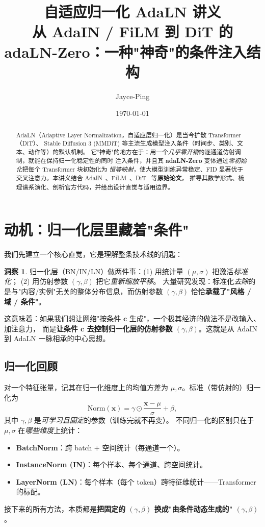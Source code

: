 \documentclass[11pt]{ctexart}
\title{\bfseries 自适应归一化 AdaLN 讲义\\[2mm]
\large 从 AdaIN / FiLM 到 DiT 的 adaLN-Zero：一种"神奇"的条件注入结构}
\author{Jayce-Ping}
\date{\today}
\newcommand{\cc}{\mathbf{c}}
\newcommand{\xx}{\mathbf{x}}
\theoremstyle{definition}
\newtheorem{insight}{洞察}[section]
\begin{document}
\maketitle

\begin{abstract}
AdaLN（Adaptive Layer Normalization，自适应层归一化）是当今扩散 Transformer（DiT）、
Stable Diffusion 3 (MMDiT) 等主流生成模型注入条件（时间步、类别、文本、动作等）的默认机制。
它"神奇"的地方在于：用一个\emph{几乎零开销}的逐通道仿射调制，就能在保持归一化稳定性的同时
注入条件，并且其 \textbf{adaLN-Zero} 变体通过\emph{零初始化}把每个 Transformer 块初始化为
\emph{恒等映射}，使大模型训练异常稳定、FID 显著优于交叉注意力。本讲义结合
AdaIN~\cite{adain}、FiLM~\cite{film}、DiT~\cite{dit} 等\textbf{原始论文}，
推导其数学形式、梳理谱系演化、剖析官方代码，并给出设计直觉与适用边界。
\end{abstract}

\tableofcontents
\bigskip

\section{动机：归一化层里藏着"条件"}

我们先建立一个核心直觉，它是理解整条技术线的钥匙：

\begin{insight}\label{ins:affine}
归一化层（BN/IN/LN）做两件事：(1) 用统计量 $(\mu,\sigma)$ 把激活\emph{标准化}；
(2) 用仿射参数 $(\gamma,\beta)$ 把它\emph{重新缩放平移}。
大量研究发现：标准化\emph{去除}的是与"内容/实例"无关的整体分布信息，而仿射参数
$(\gamma,\beta)$ 恰恰\textbf{承载了"风格 / 域 / 条件"}。
\end{insight}

这意味着：如果我们想让网络"按条件 $\cc$ 生成"，一个极其经济的做法不是改输入、加注意力，
而是\textbf{让条件 $\cc$ 去控制归一化层的仿射参数 $(\gamma,\beta)$}。这就是从 AdaIN 到 AdaLN
一脉相承的中心思想。

\subsection{归一化回顾}
对一个特征张量，记其在归一化维度上的均值方差为 $\mu,\sigma$。标准（带仿射的）归一化为
\begin{equation}
\mathrm{Norm}(\xx) = \gamma \odot \frac{\xx - \mu}{\sigma} + \beta,
\end{equation}
其中 $\gamma,\beta$ 是\emph{可学习且固定}的参数（训练完就不再变）。
不同归一化的区别只在于 $\mu,\sigma$ 在\emph{哪些维度}上统计：
\begin{itemize}
  \item \textbf{BatchNorm}：跨 batch + 空间统计（每通道一个）。
  \item \textbf{InstanceNorm (IN)}：每个样本、每个通道、跨空间统计。
  \item \textbf{LayerNorm (LN)}：每个样本（每个 token）跨特征维统计——Transformer 的标配。
\end{itemize}
接下来的所有方法，本质都是\textbf{把固定的 $(\gamma,\beta)$ 换成"由条件动态生成的" $(\gamma,\beta)$}。
\end{document}
